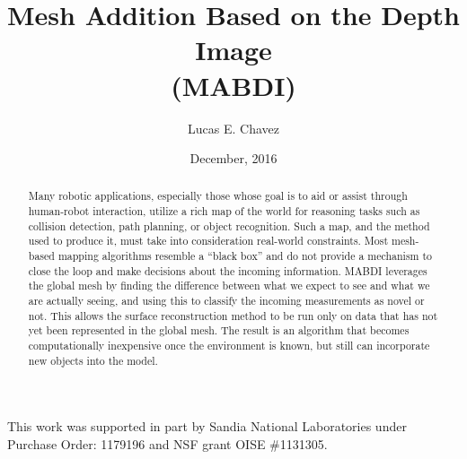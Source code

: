 \documentclass[botnum, nobox]{unmeethesis}
\begin{document}

\frontmatter

\setlength{\parskip}{0.30cm}


\title{Mesh Addition Based on the Depth Image\\(MABDI)}

\author{Lucas E. Chavez}





\date{December, 2016}

\maketitle


\begin{acknowledgments}
   \vspace{1.1in}
   This work was supported in part by Sandia National Laboratories under Purchase
   Order: 1179196 and  NSF grant OISE \#1131305.
\end{acknowledgments}

\maketitleabstract %

\begin{abstract}
  Many robotic applications, especially those whose goal is to aid or assist
  through human-robot interaction, utilize a rich map of the world for reasoning
  tasks such as collision detection, path planning, or object recognition. Such
  a map, and the method used to produce it, must take into consideration
  real-world constraints. Most mesh-based mapping algorithms resemble a ``black
  box'' and do not provide a mechanism to close the loop and make decisions
  about the incoming information. MABDI leverages the global mesh by finding the
  difference between what we expect to see and what we are actually seeing, and
  using this to classify the incoming measurements as novel or not. This allows
  the surface reconstruction method to be run only on data that has not yet been
  represented in the global mesh. The result is an algorithm that becomes
  computationally inexpensive once the environment is known, but still can
  incorporate new objects into the model.
\clearpage %
\end{abstract}
\end{document}
